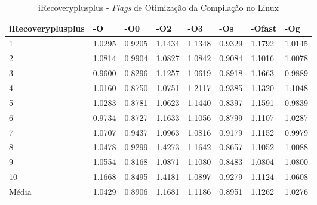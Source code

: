 \begin{apendicesenv}
\begin{table}[!ht]
\tiny
\centering
\caption{iRecoveryplusplus - \textit{Flags} de Otimização da Compilação no Linux}
\label{tab:otimizacao_compilacao:linux:irecoveryplusplus}
\begin{tabular}{llllllll}
\textbf{iRecoveryplusplus} & \textbf{-O}  & \textbf{-O0}   & \textbf{-O2} & \textbf{-O3} & \textbf{-Os} & \textbf{-Ofast} & \textbf{-Og} \\ \toprule
1                          & 1.0295       &   0.9205       &  1.1434      &   1.1348     & 0.9329       &   1.1792        &  1.0145      \\ 
2                          & 1.0814       &   0.9904       &  1.0827      &   1.0842     & 0.9084       &   1.1016        &  1.0078      \\ 
3                          & 0.9600       &   0.8296       &  1.1257      &   1.0619     & 0.8918       &   1.1663        &  0.9889      \\ 
4                          & 1.0160       &   0.8750       &  1.0751      &   1.2117     & 0.9385       &   1.1320        &  1.1048      \\ 
5                          & 1.0283       &   0.8781       &  1.0623      &   1.1440     & 0.8397       &   1.1591        &  0.9839      \\ 
6                          & 0.9734       &   0.8727       &  1.1633      &   1.1056     & 0.8799       &   1.1107        &  1.0287      \\ 
7                          & 1.0707       &   0.9437       &  1.0963      &   1.0816     & 0.9179       &   1.1152        &  0.9979      \\ 
8                          & 1.0478       &   0.9299       &  1.4273      &   1.1642     & 0.8657       &   1.1052        &  1.0088      \\ 
9                          & 1.0554       &   0.8168       &  1.0871      &   1.1080     & 0.8483       &   1.0804        &  1.0800      \\ 
10                         & 1.1668       &   0.8495       &  1.4181      &   1.0897     & 0.9279       &   1.1124        &  1.0608      \\ \bottomrule
Média                      & 1.0429       &   0.8906       &  1.1681      &   1.1186     & 0.8951       &   1.1262        &  1.0276      \\ 
\end{tabular}
\end{table}


\end{apendicesenv}
